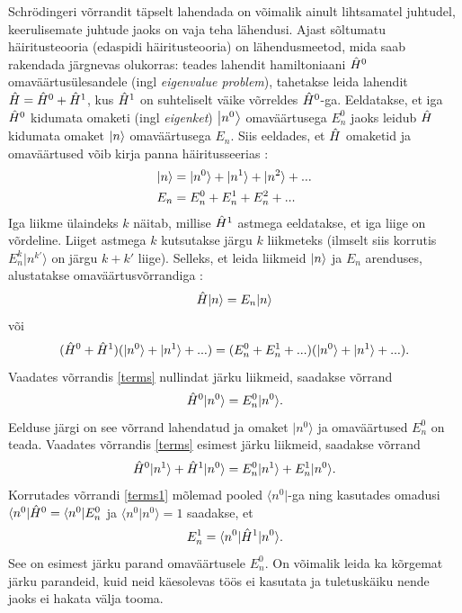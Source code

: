 \documentclass{trkut}%
\renewcommand\bra[1]{{\langle{#1}|}}
\renewcommand\ket[1]{{|{#1}\rangle}}
\renewcommand\Ket[1]{\mleft|#1\mright\rangle}
\renewcommand\braket[1]{\langle{#1}\rangle}
\begin{document}
Schrödingeri võrrandit täpselt lahendada on võimalik ainult lihtsamatel juhtudel, keerulisemate juhtude jaoks on vaja teha lähendusi.
Ajast sõltumatu häiritusteooria (edaspidi häiritusteooria) on lähendusmeetod, mida saab rakendada järgnevas olukorras: teades lahendit hamiltoniaani $\op[0]{H}$ omaväärtusülesandele (ingl \textit{eigenvalue problem}), tahetakse leida lahendit $\op{H}=\op[0]{H}+\op[1]{H}$, kus $\op[1]{H}$ on suhteliselt väike võrreldes $\op[0]{H}$-ga.
Eeldatakse, et iga $\op[0]{H}$ kidumata omaketi (ingl \textit{eigenket}) $\Ket{n^0}$ omaväärtusega $E_n^0$ jaoks leidub $\op{H}$ kidumata omaket $\Ket{n}$ omaväärtusega $E_n$.
Siis eeldades, et $\op{H}$ omaketid ja omaväärtused võib kirja panna häiritusseerias \parencite[451]{shankar94}:
\begin{align}
    \Ket{n}&=\ket{n^0}+\ket{n^1}+\ket{n^2}+... \\
    E_n&=E_n^0+E_n^1+E_n^2+...
\end{align}
Iga liikme ülaindeks $k$ näitab, millise $\op[1]{H}$ astmega eeldatakse, et iga liige on võrdeline.
Liiget astmega $k$ kutsutakse järgu $k$ liikmeteks (ilmselt siis korrutis $E_n^k \ket{n^{k'}}$ on järgu $k+k'$ liige).
Selleks, et leida liikmeid $\Ket{n}$ ja $E_n$ arenduses, alustatakse omaväärtusvõrrandiga \parencite[451-452]{shankar94}:
\begin{equation}
    \op{H}\ket{n}=E_n\ket{n}
\end{equation}
või
\begin{equation}
    (\op[0]{H} + \op[1]{H})(\ket{n^0}+\ket{n^1}+...)=(E_n^0+E_n^1+...) (\ket{n^0}+\ket{n^1}+...).
    \label{terms}
\end{equation}
Vaadates võrrandis \eqref{terms} nullindat järku liikmeid, saadakse võrrand
\begin{equation}
    \op[0]{H}\ket{n^0}=E_n^0\ket{n^0}.
\end{equation}
Eelduse järgi on see võrrand lahendatud ja omaket $\ket{n^0}$ ja omaväärtused $E_n^0$ on teada.
Vaadates võrrandis \eqref{terms} esimest järku liikmeid, saadakse võrrand
\begin{equation}
    \op[0]{H}\ket{n^1} + \op[1]{H}\ket{n^0} = E_n^0\ket{n^1} + E_n^1\ket{n^0}.
    \label{terms1}
\end{equation}
Korrutades võrrandi \eqref{terms1} mõlemad pooled $\bra{n^0}$-ga ning kasutades omadusi $\bra{n^0}\op[0]{H}=\bra{n^0}E_n^0$ ja $\braket{n^0|n^0}=1$ saadakse, et
\begin{equation}
    E_n^1=\braket{n^0|\op[1]{H}|n^0}.
    \label{parand1}
\end{equation}
See on esimest järku parand omaväärtusele $E_n^0$.
On võimalik leida ka kõrgemat järku parandeid, kuid neid käesolevas töös ei kasutata ja tuletuskäiku nende jaoks ei hakata välja tooma.
\end{document}
